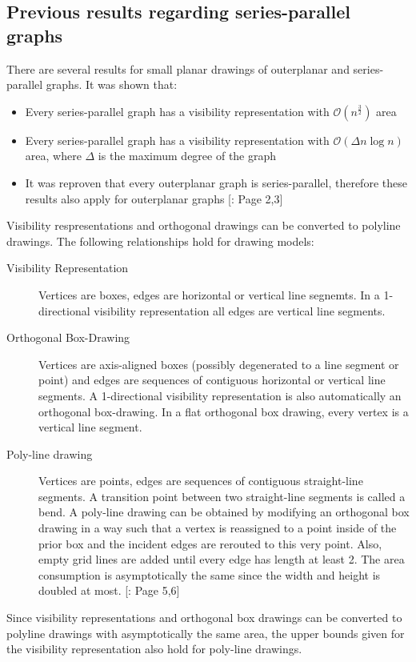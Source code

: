 \subsection{Previous results regarding series-parallel graphs}
There are several results for small planar drawings of outerplanar and series-parallel graphs. It was shown that:
\begin{itemize}
	\item Every series-parallel graph has a visibility representation with $\mathcal{O}(n^{\frac{3}{2}})$ area
	\item Every series-parallel graph has a visibility representation with $\mathcal{O}(\Delta n\log n)$ area, where $\Delta$ is the maximum degree of the graph
	\item It was reproven that every outerplanar graph is series-parallel, therefore these results also apply for outerplanar graphs [\cite{DBLP:journals/dcg/Biedl11}: Page 2,3]
\end{itemize}
Visibility respresentations and orthogonal drawings can be converted to polyline drawings. The following relationships hold for drawing models:
\begin{description}
	\item[Visibility Representation] Vertices are boxes, edges are horizontal or vertical line segnemts. In a 1-directional visibility representation all edges are vertical line segments.
	\item[Orthogonal Box-Drawing] Vertices are axis-aligned boxes (possibly degenerated to a line segment or point) and edges are sequences of contiguous horizontal or vertical line segments. A 1-directional visibility representation is also automatically an orthogonal box-drawing. In a flat orthogonal box drawing, every vertex is a vertical line segment.
	\item[Poly-line drawing] Vertices are points, edges are sequences of contiguous straight-line segments. A transition point between two straight-line segments is called a bend. A poly-line drawing can be obtained by modifying an orthogonal box drawing in a way such that a vertex is reassigned to a point inside of the prior box and the incident edges are rerouted to this very point. Also, empty grid lines are added until every edge has length at least 2. The area consumption is asymptotically the same since the width and height is doubled at most.
	[\cite{DBLP:journals/dcg/Biedl11}: Page 5,6]
\end{description}
Since visibility representations and orthogonal box drawings can be converted to polyline drawings with asymptotically the same area, the upper bounds given for the visibility representation also hold for poly-line drawings.
